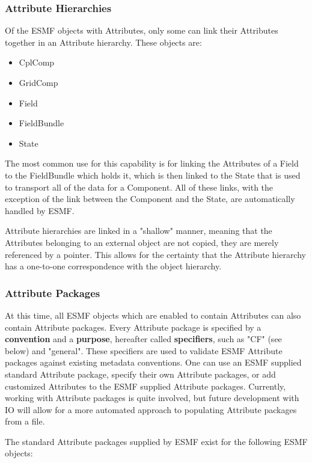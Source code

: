 \subsubsection{Attribute Hierarchies}

Of the ESMF objects with Attributes, only some can link their Attributes together in an Attribute hierarchy.  These objects are:

\begin{itemize}
\item CplComp
\item GridComp
\item Field
\item FieldBundle
\item State
\end{itemize}

The most common use for this capability is for linking the Attributes of a Field to the FieldBundle which holds it, which is then linked to the State that is used to transport all of the data for a Component.  All of these links, with the exception of the link between the Component and the State, are automatically handled by ESMF.  

Attribute hierarchies are linked in a "shallow" manner, meaning that the Attributes belonging to an external object are not copied, they are merely referenced by a pointer.  This allows for the certainty that the Attribute hierarchy has a one-to-one correspondence with the object hierarchy.  

\subsubsection{Attribute Packages}

At this time, all ESMF objects which are enabled to contain Attributes can also contain Attribute packages.  Every Attribute package is specified by a {\bf convention} and a {\bf purpose}, hereafter called {\bf specifiers}, such as "CF" (see below) and "general".  These specifiers are used to validate ESMF Attribute packages against existing metadata conventions.  One can use an ESMF supplied standard Attribute package, specify their own Attribute packages, or add customized Attributes to the ESMF supplied Attribute packages.  Currently, working with Attribute packages is quite involved, but future development with IO will allow for a more automated approach to populating Attribute packages from a file.

The standard Attribute packages supplied by ESMF exist for the following ESMF objects:

